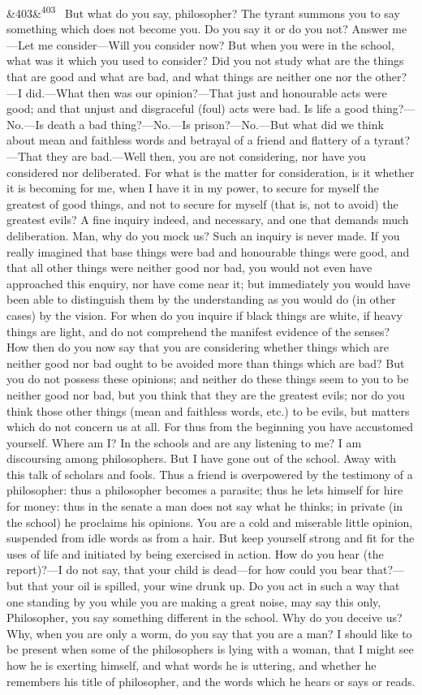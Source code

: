 \documentclass[12pt]{article}
\newcommand{\para}[1][]{\par\noindent\ifx&#1&\else\textsuperscript{\footnotesize #1}~\fi}
\begin{document}
\para[403] But what do you say, philosopher? The tyrant summons you to say something which does not become you. Do you say it or do you not? Answer me—Let me consider—Will you consider now? But when you were in the school, what was it which you used to consider? Did you not study what are the things that are good and what are bad, and what things are neither one nor the other?—I did.—What then was our opinion?—That just and honourable acts were good; and that unjust and disgraceful (foul) acts were bad. Is life a good thing?—No.—Is death a bad thing?—No.—Is prison?—No.—But what did we think about mean and faithless words and betrayal of a friend and flattery of a tyrant?—That they are bad.—Well then, you are not considering, nor have you considered nor deliberated. For what is the matter for consideration, is it whether it is becoming for me, when I have it in my power, to secure for myself the greatest of good things, and not to secure for myself (that is, not to avoid) the greatest evils? A fine inquiry indeed, and necessary, and one that demands much deliberation. Man, why do you mock us? Such an inquiry is never made. If you really imagined that base things were bad and honourable things were good, and that all other things were neither good nor bad, you would not even have approached this enquiry, nor have come near it; but immediately you would have been able to distinguish them by the understanding as you would do (in other cases) by the vision. For when do you inquire if black things are white, if heavy things are light, and do not comprehend the manifest evidence of the senses? How then do you now say that you are considering whether things which are neither good nor bad ought to be avoided more than things which are bad? But you do not possess these opinions; and neither do these things seem to you to be neither good nor bad, but you think that they are the greatest evils; nor do you think those other things (mean and faithless words, etc.) to be evils, but matters which do not concern us at all. For thus from the beginning you have accustomed yourself. Where am I? In the schools and are any listening to me? I am discoursing among philosophers. But I have gone out of the school. Away with this talk of scholars and fools. Thus a friend is overpowered by the testimony of a philosopher: thus a philosopher becomes a parasite; thus he lets himself for hire for money: thus in the senate a man does not say what he thinks; in private (in the school) he proclaims his opinions. You are a cold and miserable little opinion, suspended from idle words as from a hair. But keep yourself strong and fit for the uses of life and initiated by being exercised in action. How do you hear (the report)?—I do not say, that your child is dead—for how could you bear that?—but that your oil is spilled, your wine drunk up. Do you act in such a way that one standing by you while you are making a great noise, may say this only, Philosopher, you say something different in the school. Why do you deceive us? Why, when you are only a worm, do you say that you are a man? I should like to be present when some of the philosophers is lying with a woman, that I might see how he is exerting himself, and what words he is uttering, and whether he remembers his title of philosopher, and the words which he hears or says or reads.
\end{document}
